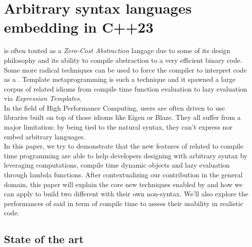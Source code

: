 \documentclass[../../main.tex]{subfiles}
\begin{document}

\chapter{Arbitrary syntax languages embedding in C++23}

\cpp is often touted as a \textit{Zero-Cost Abstraction} langage due to some of
its design philosophy and its ability to compile abstraction to a very efficient
binary code. Some more radical techniques can be used to force the compiler to
interpret \cpp code as a \dsel. Template metaprogramming is such a technique
and it spawned a large corpus of related idioms from compile time function
evaluation to lazy evaluation via \textit{Expression Templates}.\\

In the field of High Performance Computing, \cpp users are often driven to use
libraries built on top of those idioms like Eigen\cite{eigen} or
Blaze\cite{blazelib,iglberger2012_2}. They all suffer from a major limitation:
by being tied to the natural \cpp syntax, they can't express nor embed arbitrary
languages.\\

In this paper, we try to demonstrate that the new features of  related to
compile time programming are able to help developers designing \dsels with
arbitrary syntax by leveraging \constexpr computations, compile time dynamic
objects and lazy evaluation through lambda functions. After contextualizing our
contribution in the general \dsels domain, this paper will explain the core
new techniques enabled by  and how we can apply to build two different
\dsels with their own non-\cpp syntax. We'll also explore the performances of
said \dsels in term of compile time to assess their usability in realistic code.

\section{State of the art}
\end{document}
